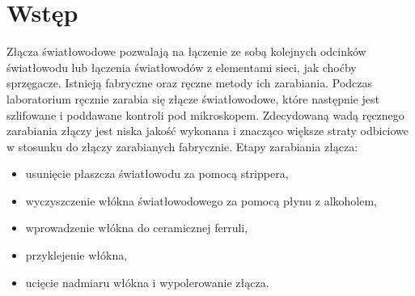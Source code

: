 \documentclass[12pt, a4paper, oneside]{article}
\begin{document}
\section{Wstęp}
\indent\indent Złącza światłowodowe pozwalają na łączenie ze sobą kolejnych odcinków światłowodu lub łączenia światłowodów z elementami sieci, jak choćby sprzęgacze. Istnieją fabryczne oraz ręczne metody ich zarabiania. Podczas laboratorium ręcznie zarabia się złącze światłowodowe, które następnie jest szlifowane i poddawane kontroli pod mikroskopem. Zdecydowaną wadą ręcznego zarabiania złączy jest niska jakość wykonana i znacząco większe straty odbiciowe w stosunku do złączy zarabianych fabrycznie. Etapy zarabiania złącza:
\begin{itemize}
\item usunięcie płaszcza światłowodu za pomocą strippera,
\item wyczyszczenie włókna światłowodowego za pomocą płynu z alkoholem,
\item wprowadzenie włókna do ceramicznej ferruli,
\item przyklejenie włókna,
\item ucięcie nadmiaru włókna i wypolerowanie złącza.
\end{itemize}
\end{document}
